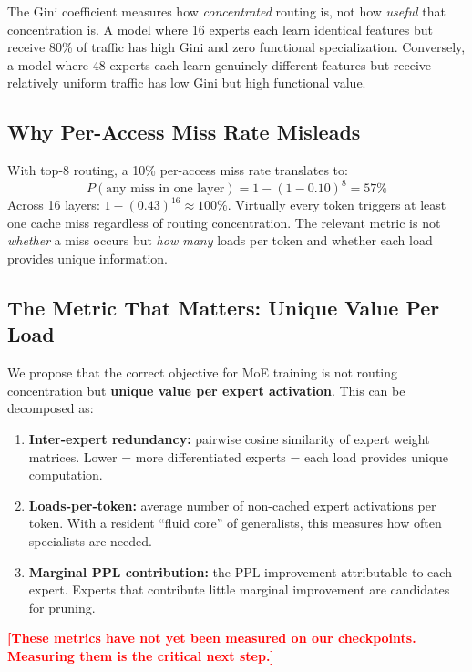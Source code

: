 \documentclass{article}
\newcommand{\placeholder}[1]{\textcolor{red}{\textbf{[#1]}}}
\begin{document}
The Gini coefficient measures how \emph{concentrated} routing is, not how \emph{useful} that concentration is. A model where 16 experts each learn identical features but receive 80\% of traffic has high Gini and zero functional specialization. Conversely, a model where 48 experts each learn genuinely different features but receive relatively uniform traffic has low Gini but high functional value.

\subsection{Why Per-Access Miss Rate Misleads}

With top-8 routing, a 10\% per-access miss rate translates to:
\begin{equation}
P(\text{any miss in one layer}) = 1 - (1 - 0.10)^8 = 57\%
\end{equation}
Across 16 layers: $1 - (0.43)^{16} \approx 100\%$. Virtually every token triggers at least one cache miss regardless of routing concentration. The relevant metric is not \emph{whether} a miss occurs but \emph{how many} loads per token and whether each load provides unique information.

\subsection{The Metric That Matters: Unique Value Per Load}

We propose that the correct objective for MoE training is not routing concentration but \textbf{unique value per expert activation}. This can be decomposed as:
\begin{enumerate}
    \item \textbf{Inter-expert redundancy:} pairwise cosine similarity of expert weight matrices. Lower = more differentiated experts = each load provides unique computation.
    \item \textbf{Loads-per-token:} average number of non-cached expert activations per token. With a resident ``fluid core'' of generalists, this measures how often specialists are needed.
    \item \textbf{Marginal PPL contribution:} the PPL improvement attributable to each expert. Experts that contribute little marginal improvement are candidates for pruning.
\end{enumerate}

\placeholder{These metrics have not yet been measured on our checkpoints. Measuring them is the critical next step.}
\end{document}
